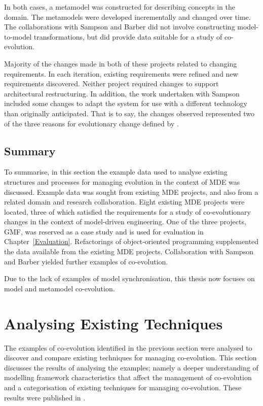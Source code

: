 In both cases, a metamodel was constructed for describing concepts in the domain. The metamodels were developed incrementally and changed over time. The collaborations with Sampson and Barber did not involve constructing model-to-model transformations, but did provide data suitable for a study of co-evolution.

Majority of the changes made in both of these projects related to changing requirements. In each iteration, existing requirements were refined and new requirements discovered. Neither project required changes to support architectural restructuring. In addition, the work undertaken with Sampson included some changes to adapt the system for use with a different technology than originally anticipated. That is to say, the changes observed represented two of the three reasons for evolutionary change defined by \cite{sjoberg93quantifying}. 


\subsection{Summary}
To summarise, in this section the example data used to analyse existing structures and processes for managing evolution in the context of MDE was discussed. Example data was sought from existing MDE projects, and also from a related domain and research collaboration. Eight existing MDE projects were located, three of which satisfied the requirements for a study of co-evolutionary changes in the context of model-driven engineering. One of the three projects, GMF, was reserved as a case study and is used for evaluation in Chapter~\ref{Evaluation}. Refactorings of object-oriented programming supplemented the data available from the existing MDE projects. Collaboration with Sampson and Barber yielded further examples of co-evolution.

Due to the lack of examples of model synchronisation, this thesis now focuses on model and metamodel co-evolution. 



\section{Analysing Existing Techniques}
\label{sec:analysing_existing_techniques}
The examples of co-evolution identified in the previous section were analysed to discover and compare existing techniques for managing co-evolution. This section discusses the results of analysing the examples; namely a deeper understanding of modelling framework characteristics that affect the management of co-evolution and a categorisation of existing techniques for managing co-evolution. These results were published in \cite{rose09analysis,rose09flock}.


